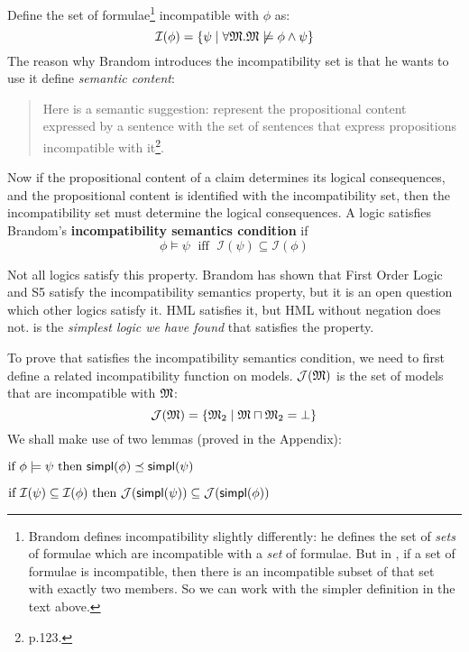 Define the set of formulae\footnote{Brandom \cite{brandom} defines
  incompatibility slightly differently: he defines the set of
  \emph{sets} of formulae which are incompatible with a \emph{set} of
  formulae.  But in \cathoristic{}, if a set of formulae is incompatible,
  then there is an incompatible subset of that set with exactly two
  members.  So we can work with the simpler definition in the text
  above.}  incompatible with $\phi$ as:
\[
\mathcal{I}(\phi) = \{
  \psi \; | \; \forall \frak{M}. \frak{M} \not \models \phi \land \psi\}
\]
The reason why Brandom introduces the incompatibility set is that he wants to use it define \emph{semantic content}:
\begin{quote}
Here is a semantic suggestion: represent the propositional content expressed by a sentence with the set of sentences that express propositions incompatible with it\footnote{\cite{brandom} p.123.}.
\end{quote}
Now if the propositional content of a claim determines its logical consequences, and the propositional content is identified with the incompatibility set, then the incompatibility set must determine the logical consequences.
A logic satisfies Brandom's \textbf{incompatibility semantics condition} if
\[
\phi \models \psi \; \mbox{ iff } \; \mathcal{I}(\psi) \subseteq \mathcal{I}(\phi)
\]

Not all logics satisfy this
property.  Brandom has shown that First Order Logic and S5 satisfy the
incompatibility semantics property, but it is an open question which
other logics satisfy it.  HML satisfies it, but HML without negation
does not.  \cathoristic{} is the \emph{simplest logic we have found} that
satisfies the property.

To prove that \cathoristic{} satisfies the incompatibility semantics condition, we need to first define a related incompatibility function on  models.
$\mathcal{J}(\frak{M})$ is the set of models that are incompatible with $\frak{M}$:
\[
\mathcal{J}(\frak{M}) = \{ \frak{M}_2 \; | \; \frak{M} \sqcap \frak{M}_2 = \bot \}
\]
We shall make use of two lemmas (proved in the Appendix):
\begin{lemma}
\label{inc1}
$\mbox{if }\phi \models \psi \mbox{ then } \mathsf{simpl}(\phi) \preceq \mathsf{simpl}(\psi)$
\end{lemma}
\begin{lemma}
\label{inc3}
$\mbox{if }\mathcal{I}(\psi) \subseteq \mathcal{I}(\phi) \mbox{ then } \mathcal{J}(\mathsf{simpl}(\psi)) \subseteq \mathcal{J}(\mathsf{simpl}(\phi))$
\end{lemma}

